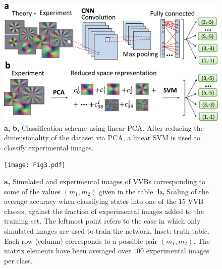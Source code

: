 \documentclass[
	aps, prl, superscriptaddress, twocolumn,
	10pt
	floatfix, 
    nofootinbib,
	tightenlines
]{revtex4-1}
\begin{document}
\begin{figure}[b]
    \centering
     \includegraphics[width=\columnwidth]{Fig2_allgreen.pdf}
    \caption{
    {\bf a,} %
    {\bf b,} 
    Classification scheme using linear PCA.
    After reducing the dimensionality of the dataset via PCA, a linear SVM is used to classify experimental images.} 
    \label{fig:class_techniques}
\end{figure}

\begin{figure}
    \centering
    \texttt{[image: Fig3.pdf]}
    \caption{ 
    \textbf{a,} Simulated and experimental images of \acp{VVB} corresponding to some of the values $(m_1,m_2)$ given in the table.
    \textbf{b,} Scaling of the average accuracy  when classifying states into one of the $15$ VVB classes, against the fraction of experimental images added to the training set. The leftmost point refers to the case in which only simulated images are used to train the network.
    Inset: truth table.
    Each row (column) corresponds to a possible pair $(m_1,m_2)$.
    The matrix elements have been averaged over $100$ experimental images per class. 
    }%
    \label{fig:resultsCNN}
\end{figure}
\end{document}
